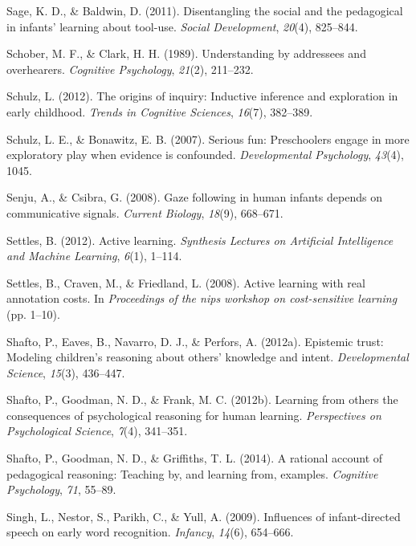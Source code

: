 \documentclass[english,floatsintext,man]{apa6}
\theoremstyle{definition}
\theoremstyle{definition}
\theoremstyle{definition}
\theoremstyle{remark}
\begin{document}
\hypertarget{ref-sage2011disentangling}{}
Sage, K. D., \& Baldwin, D. (2011). Disentangling the social and the
pedagogical in infants' learning about tool-use. \emph{Social
Development}, \emph{20}(4), 825--844.

\hypertarget{ref-schober1989understanding}{}
Schober, M. F., \& Clark, H. H. (1989). Understanding by addressees and
overhearers. \emph{Cognitive Psychology}, \emph{21}(2), 211--232.

\hypertarget{ref-schulz2012origins}{}
Schulz, L. (2012). The origins of inquiry: Inductive inference and
exploration in early childhood. \emph{Trends in Cognitive Sciences},
\emph{16}(7), 382--389.

\hypertarget{ref-schulz2007serious}{}
Schulz, L. E., \& Bonawitz, E. B. (2007). Serious fun: Preschoolers
engage in more exploratory play when evidence is confounded.
\emph{Developmental Psychology}, \emph{43}(4), 1045.

\hypertarget{ref-senju2008gaze}{}
Senju, A., \& Csibra, G. (2008). Gaze following in human infants depends
on communicative signals. \emph{Current Biology}, \emph{18}(9),
668--671.

\hypertarget{ref-settles2012active}{}
Settles, B. (2012). Active learning. \emph{Synthesis Lectures on
Artificial Intelligence and Machine Learning}, \emph{6}(1), 1--114.

\hypertarget{ref-settles2008active}{}
Settles, B., Craven, M., \& Friedland, L. (2008). Active learning with
real annotation costs. In \emph{Proceedings of the nips workshop on
cost-sensitive learning} (pp. 1--10).

\hypertarget{ref-shafto2012epistemic}{}
Shafto, P., Eaves, B., Navarro, D. J., \& Perfors, A. (2012a). Epistemic
trust: Modeling children's reasoning about others' knowledge and intent.
\emph{Developmental Science}, \emph{15}(3), 436--447.

\hypertarget{ref-shafto2012learning}{}
Shafto, P., Goodman, N. D., \& Frank, M. C. (2012b). Learning from
others the consequences of psychological reasoning for human learning.
\emph{Perspectives on Psychological Science}, \emph{7}(4), 341--351.

\hypertarget{ref-shafto2014rational}{}
Shafto, P., Goodman, N. D., \& Griffiths, T. L. (2014). A rational
account of pedagogical reasoning: Teaching by, and learning from,
examples. \emph{Cognitive Psychology}, \emph{71}, 55--89.

\hypertarget{ref-singh2009influences}{}
Singh, L., Nestor, S., Parikh, C., \& Yull, A. (2009). Influences of
infant-directed speech on early word recognition. \emph{Infancy},
\emph{14}(6), 654--666.
\end{document}
